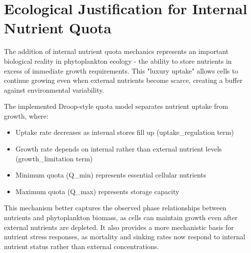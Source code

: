 \section{Ecological Justification for Internal Nutrient Quota}

The addition of internal nutrient quota mechanics represents an important biological reality in phytoplankton ecology - the ability to store nutrients in excess of immediate growth requirements. This "luxury uptake" allows cells to continue growing even when external nutrients become scarce, creating a buffer against environmental variability.

The implemented Droop-style quota model separates nutrient uptake from growth, where:
\begin{itemize}
    \item Uptake rate decreases as internal stores fill up (uptake\_regulation term)
    \item Growth rate depends on internal rather than external nutrient levels (growth\_limitation term)
    \item Minimum quota (Q\_min) represents essential cellular nutrients
    \item Maximum quota (Q\_max) represents storage capacity
\end{itemize}

This mechanism better captures the observed phase relationships between nutrients and phytoplankton biomass, as cells can maintain growth even after external nutrients are depleted. It also provides a more mechanistic basis for nutrient stress responses, as mortality and sinking rates now respond to internal nutrient status rather than external concentrations.
